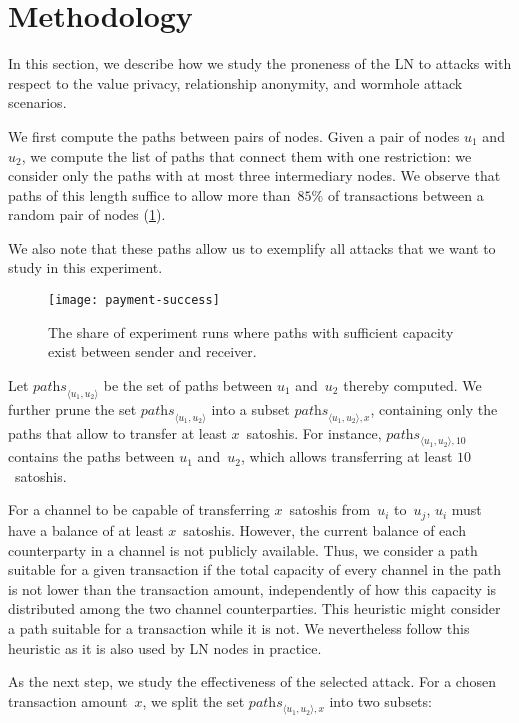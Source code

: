 \section{Methodology}
In this section, we describe how we study the proneness of the LN to attacks with respect to the value privacy, relationship anonymity, and wormhole attack scenarios.

We first compute the paths between pairs of nodes.
Given a pair of nodes $u_1$ and~$u_2$, we compute the list of paths that connect them with one restriction: we consider only the paths with at most three intermediary nodes.
We observe that paths of this length suffice to allow more than~$85\%$ of transactions between a random pair of nodes (\cref{fig:payment-success}).

We also note that these paths allow us to exemplify all attacks that we want to study in this experiment.
\begin{figure}
	\centering
	\texttt{[image: payment-success]}
	\caption{The share of experiment runs where paths with sufficient capacity exist between sender and receiver.}
	\label{fig:payment-success}
\end{figure}

Let $\textit{paths}_{\langle u_1, u_2 \rangle}$ be the set of paths between $u_1$ and~$u_2$ thereby computed.
We further prune the set $\textit{paths}_{\langle u_1, u_2 \rangle}$ into a subset $\textit{paths}_{\langle u_1, u_2 \rangle, x}$, containing only the paths that allow to transfer at least $x$~satoshis.
For instance, $\textit{paths}_{\langle u_1, u_2 \rangle, 10}$ contains the paths between $u_1$ and~$u_2$, which allows transferring at least $10$~satoshis.

For a channel to be capable of transferring $x$~satoshis from~$u_i$ to~$u_j$, $u_i$ must have a balance of at least $x$~satoshis.
However, the current balance of each counterparty in a channel is not publicly available.
Thus, we consider a path suitable for a given transaction if the total capacity of every channel in the path is not lower than the transaction amount, independently of how this capacity is distributed among the two channel counterparties.
This heuristic might consider a path suitable for a transaction while it is not.
We nevertheless follow this heuristic as it is also used by LN nodes in practice.

As the next step, we study the effectiveness of the selected attack.
For a chosen transaction amount~$x$, we split the set $\textit{paths}_{\langle u_1, u_2 \rangle, x}$ into two subsets:

